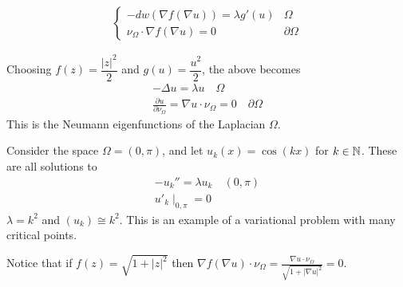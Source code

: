 \documentclass{memoir}
\begin{document}
\begin{align*}
	\begin{cases}
	-dw(\nabla f(\nabla u)) = \lambda g'(u) & \Omega \\
	\nu_\Omega \cdot \nabla f(\nabla u) = 0 & \partial\Omega
	\end{cases}
\end{align*}

\begin{exmp}
	Choosing \(f(z) = \dfrac{\left| z \right|^2 }{2}\) and \(g(u) = \dfrac{u^2}{2}\), the above becomes
	\begin{align*}
		- \Delta u = \lambda u \quad \Omega \\
		\frac{\partial u}{\partial \nu_\Omega } = \nabla u\cdot \nu_\Omega  = 0 \quad \partial\Omega 
	\end{align*}
	This is the Neumann eigenfunctions of the Laplacian \(\Omega \).
\end{exmp}

\begin{exmp}
	Consider the space \(\Omega  = (0,\pi )\), and let \(u_k(x) = \cos(kx)\) for \(k \in \mathbb{N}\). These are all solutions to
	\begin{align*}
		-u_k'' = \lambda u_k \quad (0,\pi )\\
		u'_k\mid_{0,\pi }=0
	\end{align*}
	\(\lambda =k^2\) and \((u_k) \cong k^2\). This is an example of a variational problem with many critical points.
\end{exmp}

Notice that if \(f(z) = \sqrt{1+\left| z \right|^2} \) then \(\nabla f(\nabla u) \cdot \nu_\Omega = \frac{\nabla u \cdot \nu_{\Omega }}{\sqrt{1+ \left| \nabla u \right|^2} }=0\).
\end{document}
